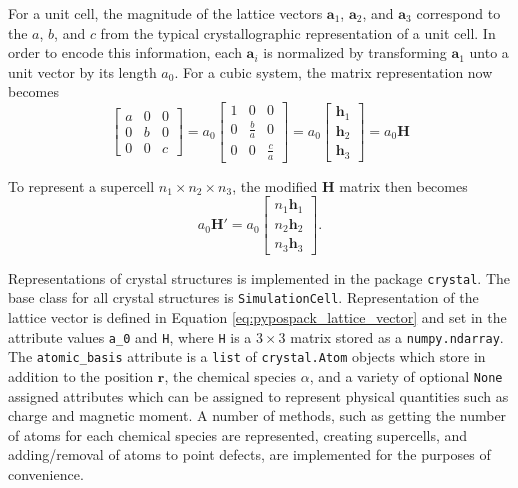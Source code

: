 For a unit cell, the magnitude of the lattice vectors $\bm{a}_1$, $\bm{a}_2$, and $\bm{a}_3$ correspond to the $a$,  $b$, and $c$ from the typical crystallographic representation of a unit cell.  In order to encode this information, each $\bm{a}_i$ is normalized by transforming $\bm{a}_1$ unto a unit vector by its length $a_0$.  For a cubic system, the matrix representation now becomes
\begin{equation}
\label{eq:pypospack_lattice_vector}
	\begin{bmatrix}
		a & 0 & 0 \\
		0 & b & 0 \\
		0 & 0 & c
	\end{bmatrix}
	=
	a_0
	\begin{bmatrix}
		1 & 0 & 0 \\
		0 & \frac{b}{a} & 0 \\
		0 & 0 & \frac{c}{a}
	\end{bmatrix}
	=
	a_0 \begin{bmatrix}
				\bm{h}_1 \\
				\bm{h}_2 \\
				\bm{h}_3
			\end{bmatrix}
	=
	a_0 \bm{H}
\end{equation}

To represent a supercell $n_1 \times n_2 \times n_3$, the modified $\bm{H}$ matrix then becomes
\begin{equation}
\label{eq:pypospack_supercell_representation}
	a_0 \bm{H}'
	=
	a_0 \begin{bmatrix}
	        n_1 \bm{h}_1 \\
					n_2 \bm{h}_2 \\
					n_3 \bm{h}_3
			\end{bmatrix}.
\end{equation}

Representations of crystal structures is implemented in the package \verb|crystal|.  The base class for all crystal structures is \verb|SimulationCell|.  Representation of the lattice vector is defined in Equation \ref{eq:pypospack_lattice_vector} and set in the attribute values \verb|a_0| and \verb|H|, where \verb|H| is a $3 \times 3$ matrix stored as a \verb|numpy.ndarray|.  The \verb|atomic_basis| attribute is a \verb|list| of \verb|crystal.Atom| objects which store in addition to the position $\bm{r}$, the chemical species $\alpha$, and a variety of optional \verb|None| assigned attributes which can be assigned to represent physical quantities such as charge and magnetic moment.
A number of methods, such as getting the number of atoms for each chemical species are represented, creating supercells, and adding/removal of atoms to point defects, are implemented for the purposes of convenience.

